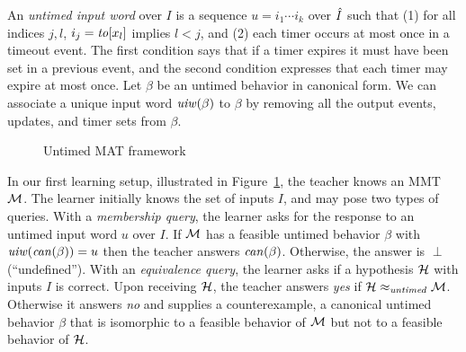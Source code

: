 An \emph{untimed input word} over $I$ is a sequence $u = i_1 \cdots i_k$ over $\hat{I}$ such that (1)
for all indices $j, l$, $i_j = \mathit{to}[x_l]$ implies $l < j$, and (2) each timer occurs at most once in a timeout event.
The first condition  says that if a timer expires it must have been set in a previous event, and the second condition  expresses that
each timer may expire at most once.
Let $\beta$ be an untimed behavior in canonical form.
We can associate a unique input word $\mathit{uiw}(\beta)$ to $\beta$ by removing all the output events,
updates, and timer sets from $\beta$.
\iflong
\begin{figure}
\begin{center}
\end{center}    
\caption{Untimed MAT framework}
\label{fig:untimed MAT}
\end{figure}
\fi

In our first learning setup, 
\iflong
illustrated in Figure~\ref{fig:untimed MAT},
\fi
the teacher knows an MMT ${\cal M}$.
The learner initially knows the set of inputs $I$, and may pose two types of queries.
With a \emph{membership query}, the learner asks for the response to an untimed input word $u$ over $I$.
If ${\cal M}$ has a feasible untimed behavior $\beta$ with $\mathit{uiw}(\mathit{can}({\beta})) = u$ then the teacher answers
$\mathit{can}({\beta})$. Otherwise, the answer is $\perp$ (``undefined'').
With an \emph{equivalence query}, the learner asks if a hypothesis ${\cal H}$ with inputs $I$ is correct.
Upon receiving ${\cal H}$, the teacher answers \emph{yes} if ${\cal H} \approx_{\mathit{untimed}} {\cal M}$.
Otherwise it answers \emph{no} and supplies a counterexample, a canonical untimed behavior $\beta$ that
is isomorphic to a feasible behavior of ${\cal M}$ but not to a feasible behavior of ${\cal H}$.

